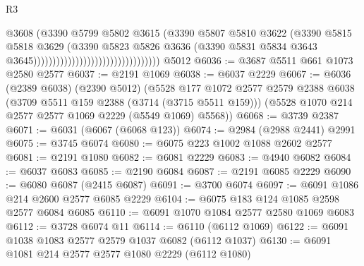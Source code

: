 \begin{lexlean}{R3}
\begin{coremodule}
                                                            @3608
                                                            (@3390
                                                              @5799
                                                              @5802
                                                              @3615
                                                              (@3390
                                                                @5807
                                                                @5810
                                                                @3622
                                                                (@3390
                                                                  @5815
                                                                  @5818
                                                                  @3629
                                                                  (@3390
                                                                    @5823
                                                                    @5826
                                                                    @3636
                                                                    (@3390
                                                                      @5831
                                                                      @5834
                                                                      @3643
                                                                      @3645)))))))))))))))))))))))))))))))))
    @5012
@6036 := @3687 @5511 @661 @1073 @2580 @2577
@6037 := @2191 @1069
@6038 := @6037 @2229
@6067 := @6036
    (@2389 @6038)
    (@2390 @5012)
    (@5528
      @177
      @1072
      @2577
      @2579
      @2388
      @6038
      (@3709 @5511 @159 @2388 (@3714 (@3715 @5511 @159)))
      (@5528 @1070 @214 @2577 @2577 @1069 @2229 (@5549 @1069) @5568))
@6068 := @3739 @2387
@6071 := @6031 (@6067 (@6068 @123))
@6074 := @2984 (@2988 @2441) @2991
@6075 := @3745 @6074
@6080 := @6075 @223 @1002 @1088 @2602 @2577
@6081 := @2191 @1080
@6082 := @6081 @2229
@6083 := @4940 @6082
@6084 := @6037 @6083
@6085 := @2190 @6084
@6087 := @2191 @6085 @2229
@6090 := @6080 @6087 (@2415 @6087)
@6091 := @3700 @6074
@6097 := @6091 @1086 @214 @2600 @2577 @6085 @2229
@6104 := @6075 @183 @124 @1085 @2598 @2577 @6084 @6085
@6110 := @6091 @1070 @1084 @2577 @2580 @1069 @6083
@6112 := @3728 @6074 @11
@6114 := @6110 (@6112 @1069)
@6122 := @6091 @1038 @1083 @2577 @2579 @1037 @6082 (@6112 @1037)
@6130 := @6091 @1081 @214 @2577 @2577 @1080 @2229 (@6112 @1080)

\end{coremodule}
\end{lexlean}
